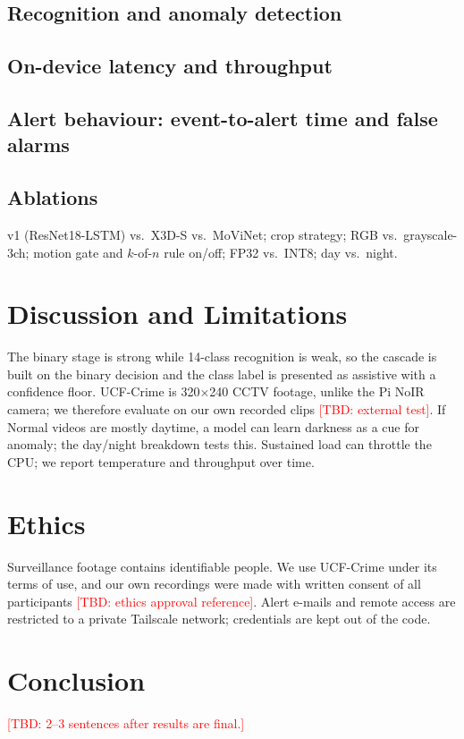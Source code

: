 \documentclass[journal]{IEEEtran}
\newcommand{\TBD}[1]{\textcolor{red}{[TBD: #1]}}
\begin{document}
\subsection{Recognition and anomaly detection}
\subsection{On-device latency and throughput}
\subsection{Alert behaviour: event-to-alert time and false alarms}
\subsection{Ablations}
v1 (ResNet18-LSTM) vs.\ X3D-S vs.\ MoViNet; crop strategy; RGB vs.\ grayscale-3ch; motion gate
and $k$-of-$n$ rule on/off; FP32 vs.\ INT8; day vs.\ night.

\section{Discussion and Limitations}
The binary stage is strong while 14-class recognition is weak, so the cascade is built on the
binary decision and the class label is presented as assistive with a confidence floor. UCF-Crime
is 320$\times$240 CCTV footage, unlike the Pi NoIR camera; we therefore evaluate on our own
recorded clips \TBD{external test}. If Normal videos are mostly daytime, a model can learn
darkness as a cue for anomaly; the day/night breakdown tests this. Sustained load can throttle
the CPU; we report temperature and throughput over time.

\section{Ethics}
Surveillance footage contains identifiable people. We use UCF-Crime under its terms of use, and
our own recordings were made with written consent of all participants
\TBD{ethics approval reference}. Alert e-mails and remote access are restricted to a private
Tailscale network; credentials are kept out of the code.

\section{Conclusion}
\TBD{2--3 sentences after results are final.}



\end{document}

